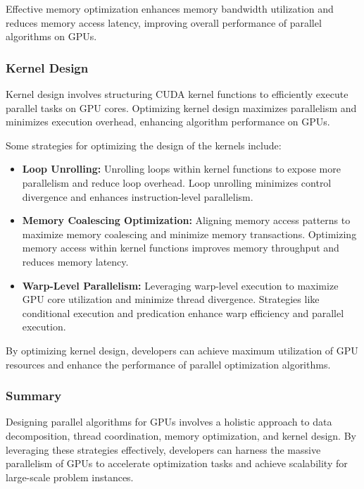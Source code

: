 \documentclass[11pt]{report}
\begin{document}
        Effective memory optimization enhances memory bandwidth utilization and reduces memory access latency, improving overall performance of parallel algorithms on GPUs.
        
        \subsubsection{Kernel Design}
        Kernel design involves structuring CUDA kernel functions to efficiently execute parallel tasks on GPU cores. Optimizing kernel design maximizes parallelism and minimizes execution overhead, enhancing algorithm performance on GPUs.

        Some strategies for optimizing the design of the kernels include:

        \begin{itemize}
            \item \textbf{Loop Unrolling:} Unrolling loops within kernel functions to expose more parallelism and reduce loop overhead. Loop unrolling minimizes control divergence and enhances instruction-level parallelism.
        
            \item \textbf{Memory Coalescing Optimization:} Aligning memory access patterns to maximize memory coalescing and minimize memory transactions. Optimizing memory access within kernel functions improves memory throughput and reduces memory latency.
        
            \item \textbf{Warp-Level Parallelism:} Leveraging warp-level execution to maximize GPU core utilization and minimize thread divergence. Strategies like conditional execution and predication enhance warp efficiency and parallel execution.
        \end{itemize}
        
        By optimizing kernel design, developers can achieve maximum utilization of GPU resources and enhance the performance of parallel optimization algorithms.
        
        \subsubsection{Summary}
        Designing parallel algorithms for GPUs involves a holistic approach to data decomposition, thread coordination, memory optimization, and kernel design. By leveraging these strategies effectively, developers can harness the massive parallelism of GPUs to accelerate optimization tasks and achieve scalability for large-scale problem instances.
\end{document}
